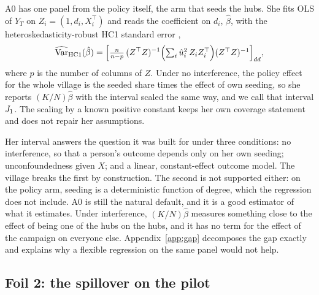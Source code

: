 A0 has one panel from the policy itself, the arm that seeds the hubs. She fits OLS
of $Y_T$ on $Z_i=(1,d_i,X_i^\top)$ and reads the coefficient on $d_i$,
$\hat\beta$, with the heteroskedasticity-robust HC1 standard error
\citep{mackinnon1985},
\begin{equation}\label{eq:hc1}
  \widehat{\operatorname{Var}}_{\mathrm{HC1}}(\hat\beta)
  =\Bigl[\tfrac{n}{n-p}\,(Z^\top Z)^{-1}
   \Bigl(\textstyle\sum_{i}\hat u_i^2\,Z_iZ_i^\top\Bigr)(Z^\top Z)^{-1}\Bigr]_{dd},
\end{equation}
where $p$ is the number of columns of $Z$. Under no interference, the policy effect
for the whole village is the seeded share times the effect of own seeding, so she
reports $(K/N)\hat\beta$ with the interval scaled the same way, and we call that
interval $J_1$. The scaling by a known positive constant keeps her own coverage
statement and does not repair her assumptions.

Her interval answers the question it was built for under three conditions: no
interference, so that a person's outcome depends only on her own seeding;
unconfoundedness given $X$; and a linear, constant-effect outcome model. The
village breaks the first by construction. The second is not supported either: on
the policy arm, seeding is a deterministic function of degree, which the
regression does not include. A0 is still the natural default, and it is a good
estimator of what it estimates. Under interference, $(K/N)\hat\beta$ measures
something close to the effect of being one of the hubs on the hubs, and it has no
term for the effect of the campaign on everyone else. Appendix~\ref{app:gap}
decomposes the gap exactly and explains why a flexible regression on the same
panel would not help.

\subsection{Foil 2: the spillover on the pilot}\label{sec:foil2}

